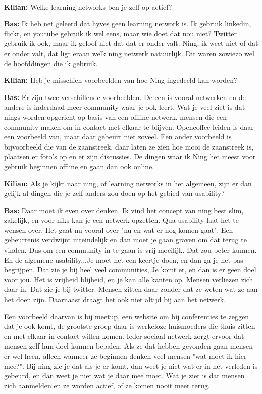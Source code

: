 \paragraph{}
\textbf{Kilian:} Welke learning networks ben je zelf op actief?

\textbf{Bas:} Ik heb net geleerd dat hyves geen learning network is. Ik gebruik linkedin, flickr, en youtube gebruik ik wel eens, maar wie doet dat nou niet? Twitter gebruik ik ook, maar ik geloof niet dat dat er onder valt. Ning, ik weet niet of dat er onder valt, dat ligt eraan welk ning netwerk natuurlijk. Dit waren zowiezo wel de hoofddingen die ik gebruik.

\textbf{Kilian:} Heb je misschien voorbeelden van hoe Ning ingedeeld kan worden?

\textbf{Bas:} Er zijn twee verschillende voorbeelden. De een is vooral netwerken en de andere is inderdaad meer community waar je ook leert. Wat je veel ziet is dat nings worden opgericht op basis van een offline netwerk. mensen die een community maken om in contact met elkaar te blijven. Opencoffee leiden is daar een voorbeeld van, maar daar gebeurt niet zoveel. Een ander voorbeeld is bijvoorbeeld die van de zaanstreek, daar laten ze zien hoe mooi de zaanstreek is, plaatsen er foto's op en er zijn discussies. De dingen waar ik Ning het meest voor gebruik beginnen offline en gaan dan ook online.

\textbf{Kilian:} Als je kijkt naar ning, of learning networks in het algemeen, zijn er dan gelijk al dingen die je zelf anders zou doen op het gebied van usability?

\textbf{Bas:} Daar moet ik even over denken. Ik vind het concept van ning best slim, zakelijk, en voor niks kan je een netwerk opzetten. Qua usability laat het te wensen over. Het gaat nu vooral over "nu en wat er nog komen gaat". Een gebeurtenis verdwijnt uiteindelijk en dan moet je gaan graven om dat terug te vinden. Dus om een community in te gaan is vrij moeilijk. Dat zou beter kunnen. En de algemene usability...Je moet het een keertje doen, en dan ga je het pas begrijpen. Dat zie je bij heel veel communities, Je komt er, en dan is er geen doel voor jou. Het is vrijheid blijheid, en je kan alle kanten op. Mensen verliezen zich daar in. Dat zie je bij twitter. Mensen zitten daar zonder dat ze weten wat ze aan het doen zijn. Daarnaast draagt het ook niet altijd bij aan het netwerk.

Een voorbeeld daarvan is bij meetup, een website om bij conferenties te zeggen dat je ook komt, de grootste groep daar is werkeloze huismoeders die thuis zitten en met elkaar in contact willen komen. Ieder sociaal netwerk zorgt ervoor dat mensen zelf hun doel kunnen bepalen. Als ze dat hebben gevonden gaan mensen er wel heen, alleen wanneer ze beginnen denken veel mensen "wat moet ik hier mee?". Bij ning zie je dat als je er komt, dan weet je niet wat er in het verleden is gebeurd, en dan weet je niet wat je daar mee moet. Wat je ziet is dat mensen zich aanmelden en ze worden actief, of ze komen nooit meer terug.

